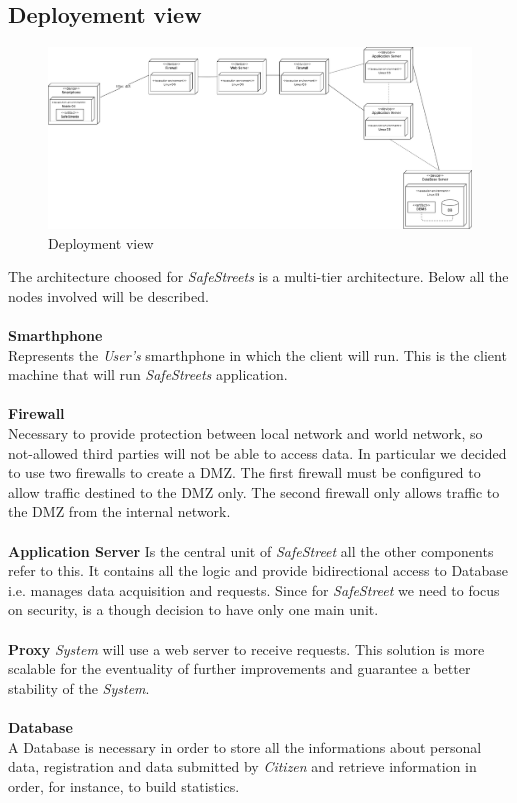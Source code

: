 \documentclass{article}
\begin{document}
\subsection{Deployement view}
\begin{figure}[H]
    \centering
    \includegraphics[scale=0.5]{img/Deployment_component.png}
    \caption{Deployment view}
\end{figure}  
The architecture choosed for \textit{SafeStreets} is a multi-tier architecture. Below all the nodes 
involved will be described.
\\
\\
\textbf{Smarthphone}\\
Represents the \textit{User's} smarthphone in which the client will run. This is the client machine
that will run \textit{SafeStreets} application.
\\
\\
\textbf{Firewall}\\
Necessary to provide protection between local network and world network, so not-allowed third parties will not be 
able to access data. In particular we decided to use two firewalls to create a DMZ. The first firewall must be configured 
to allow traffic destined to the DMZ only. The second firewall only allows traffic to the DMZ from the internal network.
\\
\\
\textbf{Application Server}
Is the central unit of \textit{SafeStreet} all the other components refer to this. It contains all
the logic and provide bidirectional access to Database i.e. manages data acquisition and requests.
Since for \textit{SafeStreet} we need to focus on security, is a though decision to have only one main
unit.
\\
\\
\textbf{Proxy}
\textit{System} will use a web server to receive requests. This solution is more scalable for the eventuality
of further improvements and guarantee a better stability of the \textit{System}.  
\\
\\
\textbf{Database}\\
A Database is necessary in order to store all the informations about personal data, registration and 
data submitted by \textit{Citizen} and retrieve information in order, for instance, to build statistics.
\end{document}
